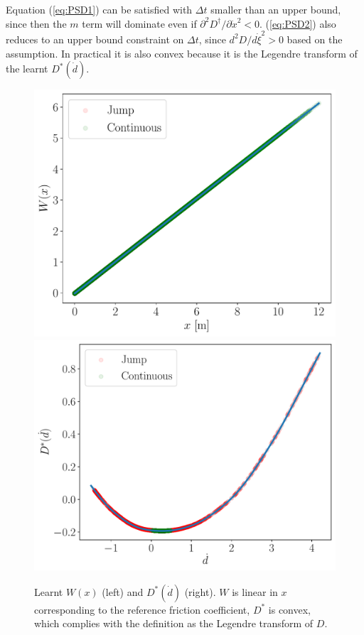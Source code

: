 Equation (\ref{eq:PSD1}) can be satisfied with $\Delta t$ smaller than an upper bound, 
since then the $m$ term will dominate even if $\partial^2 D^\dagger / \partial \dot{x}^2 < 0$. 
(\ref{eq:PSD2}) also reduces to an upper bound constraint on $\Delta t$, 
since $d^2 D / d \dot{\xi}^2 > 0$ based on the assumption. 
In practical it is also convex because it is the Legendre transform of the learnt $D^*(\dot{d})$. 


\begin{figure}[htbp]
    \centering
    \includegraphics[height=0.25\textheight]{figures/Trial0216_combined_800_W.pdf}
    \includegraphics[height=0.25\textheight]{figures/Trial0216_combined_800_D_star.pdf}
    \caption{Learnt $W(x)$ (left) and $D^*(\dot{d})$ (right). 
    $W$ is linear in $x$ corresponding to the reference friction coefficient, 
    $D^*$ is convex, 
    which complies with the definition as the Legendre transform of $D$.}
    \label{fig:WAndD}
\end{figure}
